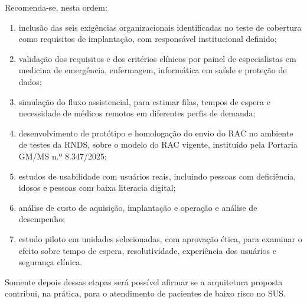 
Recomenda-se, nesta ordem:
\begin{enumerate}
    \item inclusão das seis exigências organizacionais identificadas no teste de cobertura como requisitos de implantação, com responsável institucional definido;
    \item validação dos requisitos e dos critérios clínicos por painel de especialistas em medicina de emergência, enfermagem, informática em saúde e proteção de dados;
    \item simulação do fluxo assistencial, para estimar filas, tempos de espera e necessidade de médicos remotos em diferentes perfis de demanda;
    \item desenvolvimento de protótipo e homologação do envio do RAC no ambiente de testes da RNDS, sobre o modelo do RAC vigente, instituído pela Portaria GM/MS n.º 8.347/2025;
    \item estudos de usabilidade com usuários reais, incluindo pessoas com deficiência, idosos e pessoas com baixa literacia digital;
    \item análise de custo de aquisição, implantação e operação e análise de desempenho;
    \item estudo piloto em unidades selecionadas, com aprovação ética, para examinar o efeito sobre tempo de espera, resolutividade, experiência dos usuários e segurança clínica.
\end{enumerate}

Somente depois dessas etapas será possível afirmar se a arquitetura proposta contribui, na prática, para o atendimento de pacientes de baixo risco no SUS.
